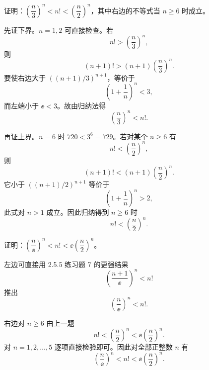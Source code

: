 \begin{xreferenceproblem}[11]
证明：$\left(\dfrac n3\right)^n<n!<\left(\dfrac n2\right)^n$，其中右边的不等式当 $n\ge6$ 时成立。
\end{xreferenceproblem}
\begin{xsolution}
先证下界。$n=1,2$ 可直接检查。若
\[
  n!>\left(\frac n3\right)^n,
\]
则
\[
  (n+1)!>(n+1)\left(\frac n3\right)^n.
\]
要使右边大于 $((n+1)/3)^{n+1}$，等价于
\[
  \left(1+\frac1n\right)^n<3,
\]
而左端小于 $\ee<3$。故由归纳法得
\[
  \left(\frac n3\right)^n<n!.
\]

再证上界。$n=6$ 时 $720<3^6=729$。若对某个 $n\ge6$ 有
\[
  n!<\left(\frac n2\right)^n,
\]
则
\[
  (n+1)!<(n+1)\left(\frac n2\right)^n.
\]
它小于 $((n+1)/2)^{n+1}$ 等价于
\[
  \left(1+\frac1n\right)^n>2,
\]
此式对 $n>1$ 成立。因此归纳得到 $n\ge6$ 时
\[
  n!<\left(\frac n2\right)^n.
\]
\end{xsolution}


\begin{xreferenceproblem}[12]
证明：$\left(\dfrac n\ee\right)^n<n!<\ee\left(\dfrac n2\right)^n$。
\end{xreferenceproblem}
\begin{xsolution}
左边可直接用 2.5.5 练习题 7 的更强结果
\[
  \left(\frac{n+1}{\ee}\right)^n<n!
\]
推出
\[
  \left(\frac n\ee\right)^n<n!.
\]

右边对 $n\ge6$ 由上一题
\[
  n!<\left(\frac n2\right)^n<\ee\left(\frac n2\right)^n.
\]
对 $n=1,2,\ldots,5$ 逐项直接检验即可。因此对全部正整数 $n$ 有
\[
  \boxed{\left(\frac n\ee\right)^n<n!<\ee\left(\frac n2\right)^n}.
\]
\end{xsolution}


